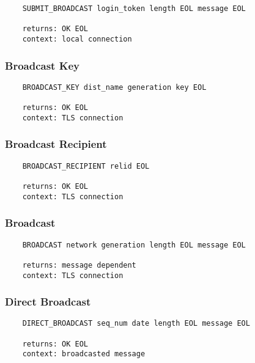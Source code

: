 \documentclass[letterpaper,11pt,oneside]{article}
\begin{document}
\vspace{10pt}
\begin{verbatim}
    SUBMIT_BROADCAST login_token length EOL message EOL

    returns: OK EOL
    context: local connection
\end{verbatim}
\vspace{10pt}

\subsubsection{Broadcast Key}

\vspace{10pt}
\begin{verbatim}
    BROADCAST_KEY dist_name generation key EOL

    returns: OK EOL
    context: TLS connection
\end{verbatim}
\vspace{10pt}

\subsubsection{Broadcast Recipient}

\vspace{10pt}
\begin{verbatim}
    BROADCAST_RECIPIENT relid EOL

    returns: OK EOL
    context: TLS connection
\end{verbatim}
\vspace{10pt}

\subsubsection{Broadcast}

\vspace{10pt}
\begin{verbatim}
    BROADCAST network generation length EOL message EOL

    returns: message dependent
    context: TLS connection
\end{verbatim}
\vspace{10pt}

\subsubsection{Direct Broadcast}

\vspace{10pt}
\begin{verbatim}
    DIRECT_BROADCAST seq_num date length EOL message EOL

    returns: OK EOL
    context: broadcasted message
\end{verbatim}
\end{document}
